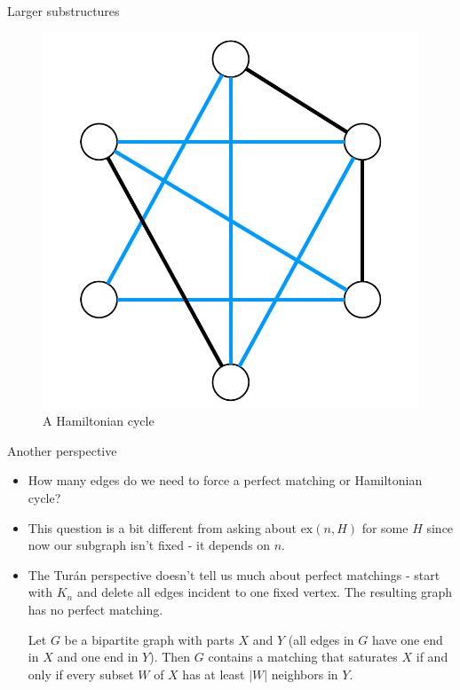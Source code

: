 \documentclass{beamer}
\theoremstyle{plain}
\begin{document}
\begin{frame}{Larger substructures}
\begin{figure}
\begin{overprint}
				\centering\includegraphics[scale=.5]{ham_cycle.pdf}\caption{A Hamiltonian cycle}
			\end{overprint}
		\end{figure}
	\end{frame}


	\begin{frame}{Another perspective}
		\begin{itemize}

			\item How many edges do we need to force a perfect matching or Hamiltonian cycle?

			\pause

			\item This question is a bit different from asking about $\text{ex}(n, H)$ for some $H$ since now our subgraph isn't fixed - it depends on $n$.

			\pause

			\item The Tur\'an perspective doesn't tell us much about perfect matchings - start with $K_n$ and delete all edges incident to one fixed vertex.
			The resulting graph has no perfect matching.

			\pause

			\begin{theorem}[P. Hall - 1935]
				Let $G$ be a bipartite graph with parts $X$ and $Y$ (all edges in $G$ have one end in $X$ and one end in $Y$).
				Then $G$ contains a matching that saturates $X$ if and only if every subset $W$ of $X$ has at least $|W|$ neighbors in $Y$.
			\end{theorem}	

		\end{itemize}
	\end{frame}
\end{document}

